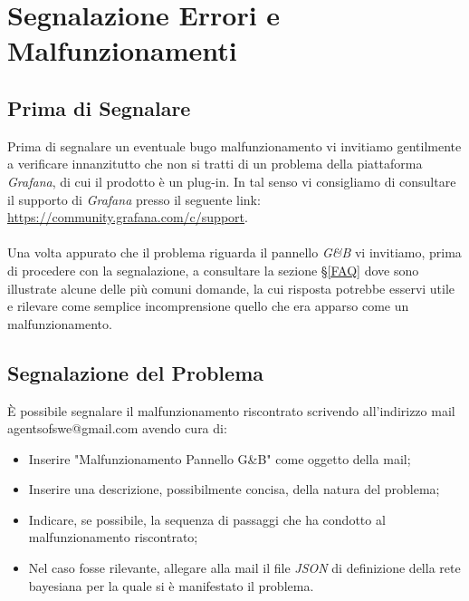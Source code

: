 \section{Segnalazione Errori e Malfunzionamenti}\label{Segnalazione}

\subsection{Prima di Segnalare}\label{BeforeReport}
Prima di segnalare un eventuale bug\glossario o malfunzionamento vi invitiamo gentilmente a verificare innanzitutto che non si tratti di un problema della piattaforma \textit{Grafana}, di cui il prodotto è un plug-in. In tal senso vi consigliamo di consultare il supporto di \textit{Grafana} presso il seguente link: \url{https://community.grafana.com/c/support}.\\
~\\
Una volta appurato che il problema riguarda il pannello \textit{G\&B} vi invitiamo, prima di procedere con la segnalazione, a consultare la sezione §\ref{FAQ} dove sono illustrate alcune delle più comuni domande, la cui risposta potrebbe esservi utile e rilevare come semplice incomprensione quello che era apparso come un malfunzionamento.

\subsection{Segnalazione del Problema}\label{Report}
È possibile segnalare il malfunzionamento riscontrato scrivendo all'indirizzo mail agentsofswe@gmail.com avendo cura di:
\begin{itemize}
	\item Inserire "Malfunzionamento Pannello G\&B" come oggetto della mail;
	\item Inserire una descrizione, possibilmente concisa, della natura del problema;
	\item Indicare, se possibile, la sequenza di passaggi che ha condotto al malfunzionamento riscontrato;
	\item Nel caso fosse rilevante, allegare alla mail il file \textit{JSON} di definizione della rete bayesiana per la quale si è manifestato il problema.
\end{itemize}
